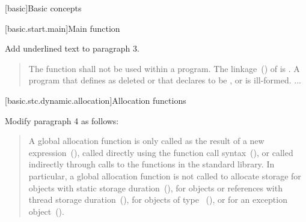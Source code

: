 
\setcounter{chapter}{5}
[basic]{Basic concepts}

\setcounter{section}{6}

[basic.start.main]{Main function}

Add underlined text to paragraph 3.

\begin{quote}
	\setcounter{Paras}{2}

\pnum
The function  shall not be used within
a program.
%
The linkage~() of  is
. A program that defines  as
deleted or that declares  to be
 , or  is ill-formed. 
 ...
\end{quote}

\setcounter{section}{7}
\setcounter{subsection}{4}
[basic.stc.dynamic.allocation]{Allocation functions}

Modify paragraph 4 as follows:

\begin{quote}
	\setcounter{Paras}{3}
\pnum

A global allocation function is only called as the result of a new
expression~(),  called directly using the function call
syntax~(), 
or called indirectly through calls to the
functions in the \Cpp standard library. \enternote In particular, a
global allocation function is not called to allocate storage for objects
with static storage duration~(), for objects or references
with thread storage duration~(), for objects of
type ~(), or for an
exception object~().
\exitnote
\end{quote}

